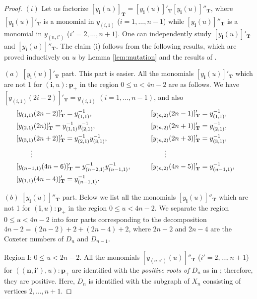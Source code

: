 \documentclass[11pt]{article}
\numberwithin{equation}{section}
\theoremstyle{definition}
\begin{document}
\begin{proof}
$(i)$ Let us factorize $[y_{\mathbf{i}}(u)]_{\mathbf{T}}
=[y_{\mathbf{i}}(u)]'_{\mathbf{T}}
[y_{\mathbf{i}}(u)]''_{\mathbf{T}}$,
where
 $[y_{\mathbf{i}}(u)]'_{\mathbf{T}}$ is a monomial
in $y_{(i,1)}$ ($i=1,\dots,n-1$)
while
 $[y_{\mathbf{i}}(u)]''_{\mathbf{T}}$ is a monomial
in $y_{(n,i')}$ ($i'=2,\dots,n+1$).
One can independently study
$[y_{\mathbf{i}}(u)]'_{\mathbf{T}}$ and
$[y_{\mathbf{i}}(u)]''_{\mathbf{T}}$.
The claim  (i) follows from the following results,
which  are proved inductively on $u$
by Lemma \ref{lem:mutation} and the results of
\cite{Fomin03b,Fomin07}.

$(a)$ $[y_{\mathbf{i}}(u)]'_{\mathbf{T}}$ part.
This part is easier.
All the monomials $[y_{\mathbf{i}}(u)]'_{\mathbf{T}}$
 which are not 1 for $(\mathbf{i},u):\mathbf{p}_+$
in the region $0 \leq u < 4n-2$ are as follows.
We have $[y_{(i,1)}(2i-2)]'_{\mathbf{T}}=y_{(i,1)}$
$(i=1,\dots,n-1)$,
and also
\begin{alignat}{3}
& [y_{(1,1)}(2n-2)]'_{\mathbf{T}}=y_{(1,1)}^{-1},\qquad &&
[y_{(n,2)}(2n-1)]'_{\mathbf{T}}=y_{(1,1)}^{-1},&\notag\\
& [y_{(2,1)}(2n)]'_{\mathbf{T}}=y_{(1,1)}^{-1}y_{(2,1)}^{-1},\qquad &&
[y_{(n,2)}(2n+1)]'_{\mathbf{T}}=y_{(2,1)}^{-1},&\notag\\
\label{eq:y'part}
& [y_{(3,1)}(2n+2)]'_{\mathbf{T}}=y_{(2,1)}^{-1}y_{(3,1)}^{-1},\qquad &&
[y_{(n,2)}(2n+3)]'_{\mathbf{T}}=y_{(3,1)}^{-1},&\\
&\qquad \vdots & &\qquad \vdots & \notag\\
& [y_{(n-1,1)}(4n-6)]'_{\mathbf{T}}=y_{(n-2,1)}^{-1}y_{(n-1,1)}^{-1},\qquad &&
[y_{(n,2)}(4n-5)]'_{\mathbf{T}}=y_{(n-1,1)}^{-1},&\notag\\
& [y_{(1,1)}(4n-4)]'_{\mathbf{T}}=y_{(n-1,1)}^{-1}.&&& \notag
\end{alignat}

$(b)$  $[y_{\mathbf{i}}(u)]''_{\mathbf{T}}$ part.
Below we list all the monomials $[y_{\mathbf{i}}(u)]''_{\mathbf{T}}$
which are not 1 for $(\mathbf{i},u):\mathbf{p}_+$
in the region $0 \leq u < 4n-2$.
We separate the region $0 \leq u < 4n-2$ into four parts
corresponding to the decomposition
$4n-2=(2n-2)+2+(2n-4)+2$,
where $2n-2$ and $2n-4$ are the Coxeter numbers
of $D_{n}$ and $D_{n-1}$.


Region I: $0\leq u < 2n-2$.
All the  monomials
$[y_{(n,i')}(u)]''_{\mathbf{T}}$ ($i'=2,\dots,n+1$)
 for $(\mathbf{(n,i')},u):\mathbf{p}_+$
are identif\/ied with
the {\em positive roots of $D_n$} as in
\cite[Proposition 10.7]{Fomin07};
therefore, they are positive.
Here, $D_{n}$ is identif\/ied with the subgraph of $X_n$
consisting of vertices $2, \dots, n+1$.



\end{proof}
\end{document}
